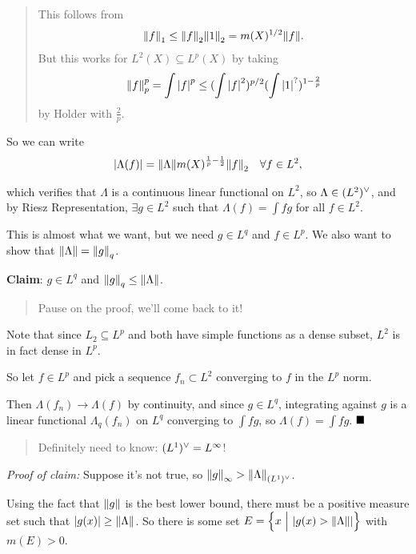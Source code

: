 \begin{quote}
This follows from
\begin{align*}{\left\lVert {f} \right\rVert}_1 \leq {\left\lVert {f} \right\rVert}_2 {\left\lVert {1} \right\rVert}_2 = m(X)^{1/2} {\left\lVert {f} \right\rVert}
.\end{align*} But this works for \(L^2(X) \subseteq L^p(X)\) by taking
\begin{align*}
{\left\lVert {f} \right\rVert}_p^p = \int {\left\lvert {f} \right\rvert}^p \leq ( \int {\left\lvert {f} \right\rvert}^2 )^{p/2} (\int {\left\lvert {1} \right\rvert}^{?})^{1 - \frac 2 p}
\end{align*} by Holder with \(\frac 2 p\).
\end{quote}

So we can write
\begin{align*}
{\left\lvert {\Lambda(f)} \right\rvert} = {\left\lVert {\Lambda} \right\rVert} m(X)^{\frac 1 p - \frac 1 2} {\left\lVert {f} \right\rVert}_2 \quad \forall f\in L^2,
\end{align*}

which verifies that \(\Lambda\) is a continuous linear functional on
\(L^2\), so \(\Lambda \in (L^2)^\vee\), and by Riesz Representation,
\(\exists g \in L^2\) such that \(\Lambda(f) = \int fg\) for all
\(f\in L^2\).

This is almost what we want, but we need \(g\in L^q\) and \(f\in L^p\).
We also want to show that \({\left\lVert {\Lambda} \right\rVert} = {\left\lVert {g} \right\rVert}_q\).

\textbf{Claim}: \(g\in L^q\) and \({\left\lVert {g} \right\rVert}_q \leq {\left\lVert {\Lambda} \right\rVert}\).

\begin{quote}
Pause on the proof, we'll come back to it!
\end{quote}

Note that since \(L_2 \subseteq L^p\) and both have simple functions as
a dense subset, \(L^2\) is in fact dense in \(L^p\).

So let \(f \in L^p\) and pick a sequence \(f_n \subset L^2\) converging
to \(f\) in the \(L^p\) norm.

Then \(\Lambda(f_n) \to \Lambda(f)\) by continuity, and since
\(g\in L^q\), integrating against \(g\) is a linear functional
\(\Lambda_q (f_n)\) on \(L^q\) converging to \(\int f g\), so
\(\Lambda(f) = \int fg\). \(\qed\)

\begin{quote}
Definitely need to know: \((L^1)^\vee = L^\infty\)!
\end{quote}

\emph{Proof of claim:} Suppose it's not true, so
\({\left\lVert {g} \right\rVert}_\infty > {\left\lVert {\Lambda} \right\rVert}_{(L^1)^\vee}\).

Using the fact that \({\left\lVert {g} \right\rVert}\) is the best lower bound, there must be
a positive measure set such that \({\left\lvert {g(x)} \right\rvert} \geq {\left\lVert {\Lambda} \right\rVert}\). So
there is some set
\(E = \left\{{x {~\mathrel{\Big|}~} {\left\lvert {g(x) > {\left\lVert {\Lambda} \right\rVert}} \right\rvert}}\right\}\) with
\(m(E) > 0\).


